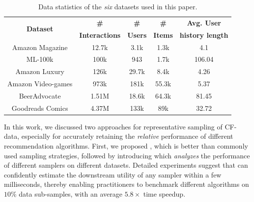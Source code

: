 \begin{table}[!ht]
    \begin{footnotesize} %
    \begin{center}
        \begin{tabular}{c | c c c c}
            \toprule
            \multirow{2}{*}{\textbf{Dataset}} & \textbf{\#} & \textbf{\#} & \textbf{\#} & \textbf{Avg. User} \\ 
            & \textbf{Interactions} & \textbf{Users} & \textbf{Items} & \textbf{history length} \\
            \midrule
            
            Amazon Magazine      & 12.7k & 3.1k  & 1.3k  & 4.1 \\
            ML-100k              & 100k  & 943   & 1.7k  & 106.04 \\
            Amazon Luxury        & 126k  & 29.7k & 8.4k  & 4.26 \\
            Amazon Video-games   & 973k  & 181k  & 55.3k & 5.37 \\
            BeerAdvocate         & 1.51M & 18.6k & 64.3k & 81.45 \\
            Goodreads Comics     & 4.37M & 133k  & 89k   & 32.72 \\
            
            \bottomrule
        \end{tabular}
    \end{center}
    \end{footnotesize}
    \vspace{2mm}
    \caption{Data statistics of the \emph{six} datasets used in this paper.}
    \label{data_stats}
    \vspace{-6mm} %
\end{table}
In this work, we discussed two approaches for representative sampling of CF-data, especially for accurately retaining the \emph{relative} performance of different recommendation algorithms. First, we proposed \sampler, which is better than commonly used sampling strategies, followed by introducing \oracle which \emph{analyzes} the performance of different samplers on different datasets. Detailed experiments suggest that \oracle can confidently estimate the downstream utility of any sampler within a few milliseconds, thereby enabling practitioners to benchmark different algorithms on $10$\% data sub-samples, with an average $5.8\times$ time speedup.

